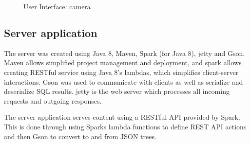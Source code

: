 \documentclass[conference]{IEEEtran}
\begin{document}
\begin{figure}[!t]
	\centering
	\vfil
	\caption{User Interface: camera}
	\label{fig:ui_cam}
\end{figure}

%



\subsection{Server application}

The server was created using Java 8, Maven, Spark (for Java 8), jetty and Gson. Maven allows simplified project
management and deployment, and spark allows creating RESTful service using Java 8's lambdas, which
simplifies client-server interactions. Gson was used to communicate with clients as well as serialize
and deserialize SQL results. jetty is the web server which processes all incoming requests and outgoing responses.

The server application serves content using a RESTful API provided by Spark. This is done through using Sparks
lambda functions to define REST API actions and then Gson to convert to and from JSON trees.
\end{document}
